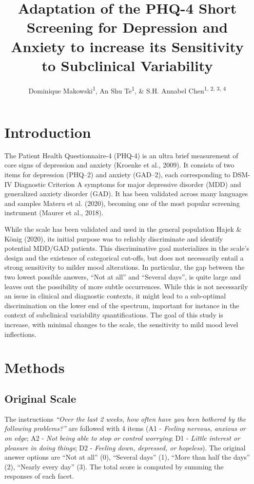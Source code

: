 \documentclass[
  man,floatsintext]{apa6}
\title{\textbf{Adaptation of the PHQ-4 Short Screening for Depression and Anxiety to increase its Sensitivity to Subclinical Variability}}
\author{Dominique Makowski\textsuperscript{1}, An Shu Te\textsuperscript{1}, \& S.H. Annabel Chen\textsuperscript{1, 2, 3, 4}}
\date{}
\affiliation{\vspace{0.5cm}\textsuperscript{1} School of Social Sciences, Nanyang Technological University, Singapore\\\textsuperscript{2} LKC Medicine, Nanyang Technological University, Singapore\\\textsuperscript{3} National Institute of Education, Singapore\\\textsuperscript{4} Centre for Research and Development in Learning, Nanyang Technological University, Singapore}
\begin{document}
\maketitle

\hypertarget{introduction}{%
\section{Introduction}\label{introduction}}

The Patient Health Questionnaire-4 (PHQ-4) is an ultra brief measurement of core signs of depression and anxiety (Kroenke et al., 2009). It consists of two items for depression (PHQ--2) and anxiety (GAD--2), each corresponding to DSM-IV Diagnostic Criterion A symptoms for major depressive disorder (MDD) and generalized anxiety disorder (GAD). It has been validated across many languages and samples Materu et al. (2020), becoming one of the most popular screening instrument (Maurer et al., 2018).

While the scale has been validated and used in the general population Hajek \& König (2020), its initial purpose was to reliably discriminate and identify potential MDD/GAD patients. This discriminative goal materializes in the scale's design and the existence of categorical cut-offs, but does not necessarily entail a strong sensitivity to milder mood alterations. In particular, the gap between the two lowest possible answers, ``Not at all'' and ``Several days'', is quite large and leaves out the possibility of more subtle occurrences. While this is not necessarily an issue in clinical and diagnostic contexts, it might lead to a sub-optimal discrimination on the lower end of the spectrum, important for instance in the context of subclinical variability quantifications. The goal of this study is increase, with minimal changes to the scale, the sensitivity to mild mood level inflections.

\hypertarget{methods}{%
\section{Methods}\label{methods}}

\hypertarget{original-scale}{%
\subsection{Original Scale}\label{original-scale}}

The instructions \emph{``Over the last 2 weeks, how often have you been bothered by the following problems?''} are followed with 4 items (A1 - \emph{Feeling nervous, anxious or on edge}; A2 - \emph{Not being able to stop or control worrying}; D1 - \emph{Little interest or pleasure in doing things}; D2 - \emph{Feeling down, depressed, or hopeless}). The original answer options are ``Not at all'' (0), ``Several days'' (1), ``More than half the days'' (2), ``Nearly every day'' (3). The total score is computed by summing the responses of each facet.
\end{document}
